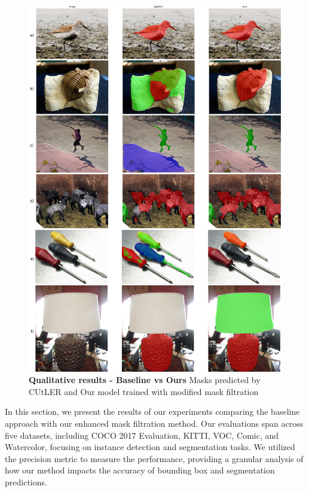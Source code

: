 \begin{figure}
	\centering
	\includegraphics[width=1.05\textwidth]{Images/main/cutler_vs_ours.png}
	\caption[\textbf{Qualitative Results - Baseline vs Ours}]{\textbf{Qualitative results - Baseline vs Ours} Masks predicted by CUtLER and Our model trained with modified mask filtration}
	\label{fig:cuter_vs_ours}
\end{figure}

In this section, we present the results of our experiments comparing the baseline approach with our enhanced mask filtration method. Our evaluations span across five datasets, including COCO 2017 Evaluation, KITTI, VOC, Comic, and Watercolor, focusing on instance detection and segmentation tasks. We utilized the precision metric to measure the performance, providing a granular analysis of how our method impacts the accuracy of bounding box and segmentation predictions.

